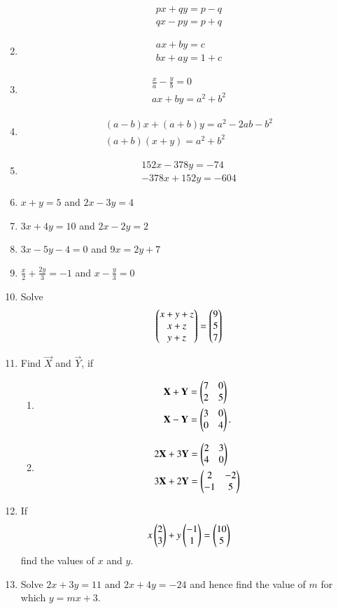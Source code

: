 \begin{enumerate}[label=\thesubsection.\arabic*,ref=\thesubsection.\theenumi]
\begin{align}
px+qy=p-q\\ qx-py=p+q
\end{align}
\item
\begin{align}                                                   
ax+by=c\\ bx+ay=1+c
\end{align}
\item 
\begin{align}
\frac {x}{a}-\frac{y}{b}=0\\ ax+by=a^2+b^2
\end{align}
\item
\begin{align}
(a-b)x+(a+b)y=a^2-2ab-b^2\\ (a+b)(x+y)=a^2+b^2
\end{align}
\item
\begin{align}
152x-378y=-74\\ -378x+152y=-604
\end{align}
\item $x+y=5$ and $2x-3y=4$
\item $3x+4y=10$ and $ 2x-2y=2$
\item $3x-5y-4=0$ and $9x=2y+7$
\item $\frac{x}{2}+\frac{2y}{3}=-1$ and $x-\frac{y}{3}=0$
\item Solve
\begin{align}
\begin{pmatrix}x+y+z \\ x+z \\ y+z \end{pmatrix}=
\begin{pmatrix}9 \\ 5 \\  7\end{pmatrix}
\end{align}
\item Find $\vec{X}$ and $\vec{Y}$, if
\begin{enumerate}
\item 
\begin{align}
	\mathbf{X}+\mathbf{Y}&= \begin{pmatrix}7 & 0 \\ 2 & 5\end{pmatrix} 
\\
		\mathbf{X}-\mathbf{Y}&=\begin{pmatrix}3 & 0 \\ 0 & 4\end{pmatrix}.
\end{align}
\item 
\begin{align}
	2\mathbf{X}+3\mathbf{Y}&=\begin{pmatrix}2 & 3 \\ 4 & 0\end{pmatrix}  
	\\
	3\mathbf{X}+2\mathbf{Y}&=\begin{pmatrix}2 & -2 \\ -1 & 5\end{pmatrix}
\end{align}
\end{enumerate}
\item If 
\begin{align}
	x \begin{pmatrix}2 \\ 3\end{pmatrix} + y \begin{pmatrix}-1 \\ 1\end{pmatrix}= \begin{pmatrix}10 \\ 5\end{pmatrix}
\end{align}
find the values of $x$ and $y$.
\item Solve $2x+3y=11$ and $2x+4y=-24$ and hence find the value of $m$ for which $y=mx+3$.
\end{enumerate}

